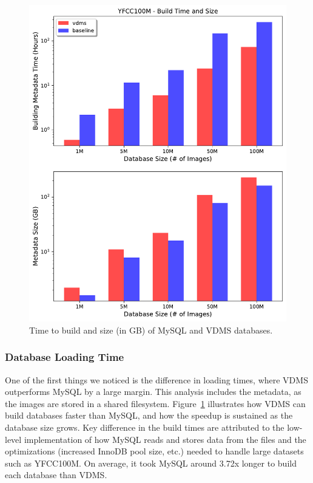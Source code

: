 \begin{figure}
\centering
\includegraphics[width=\columnwidth]{figures/db_time_size}
\caption{Time to build and size (in GB) of MySQL and VDMS databases.}
\label{fig:db_time_size}
\end{figure}

\subsubsection{Database Loading Time}

One of the first things we noticed is the difference in loading times,
where VDMS outperforms MySQL by a large margin.
This analysis includes the metadata, as the images are stored in a shared filesystem. 
Figure~\ref{fig:db_time_size} illustrates how VDMS can build databases
faster than MySQL, and how the speedup is sustained as the database size grows.
Key difference in the build times are attributed to the low-level
implementation of how MySQL reads and stores data from the files and the
optimizations (increased InnoDB pool size, etc.) needed
to handle large datasets such as YFCC100M.
On average, it took MySQL around 3.72x longer to build each database than VDMS.

